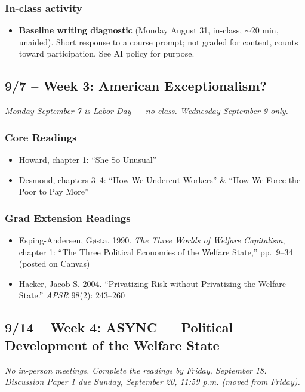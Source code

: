 \documentclass[12pt]{article}
\begin{document}
    \subsubsection*{In-class activity}
        \begin{itemize}
            \item \textbf{Baseline writing diagnostic} (Monday August 31, in-class, $\sim$20 min, unaided). Short response to a course prompt; not graded for content, counts toward participation. See AI policy for purpose.
        \end{itemize}

\subsection*{9/7 -- Week 3: American Exceptionalism?}
\emph{Monday September 7 is Labor Day --- no class. Wednesday September 9 only.}
    \subsubsection*{Core Readings}
        \begin{itemize}
            \item Howard, chapter 1: ``She So Unusual''
            \item Desmond, chapters 3--4: ``How We Undercut Workers'' \& ``How We Force the Poor to Pay More''
        \end{itemize}
    \subsubsection*{Grad Extension Readings}
        \begin{itemize}
            \item Esping-Andersen, Gøsta. 1990. \emph{The Three Worlds of Welfare Capitalism}, chapter 1: ``The Three Political Economies of the Welfare State,'' pp.\ 9--34 (posted on Canvas)
            \item Hacker, Jacob S. 2004. ``Privatizing Risk without Privatizing the Welfare State.'' \emph{APSR} 98(2): 243--260
        \end{itemize}

\subsection*{9/14 -- Week 4: \textbf{ASYNC} --- Political Development of the Welfare State}
\emph{No in-person meetings. Complete the readings by Friday, September 18. Discussion Paper 1 due Sunday, September 20, 11:59 p.m. (moved from Friday).}
\end{document}
